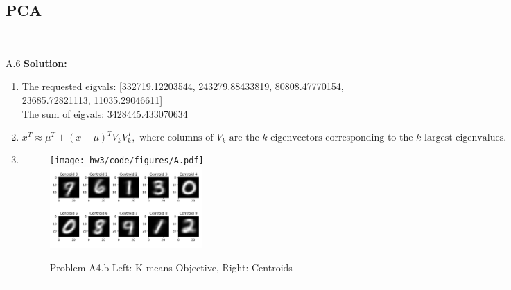 \documentclass{article}
\newcommand{\1}{\mathbf{1}}
\begin{document}
\subsection*{PCA}
\noindent\rule{\textwidth}{1pt}
\\
A.6 {\bf Solution:}\\
\begin{enumerate}
    \item The requested eigvals: [332719.12203544, 243279.88433819, 80808.47770154,  23685.72821113,  11035.29046611] \\
The sum of eigvals: 3428445.433070634
    \item $$
    x^T \approx \mu^T + (x-\mu)^TV_kV_k^T, \text{  where columns of $V_k$ are the $k$  eigenvectors corresponding to the $k$ largest eigenvalues.}
    $$
    \item \begin{figure}[h!]
            \centering
            \texttt{[image: hw3/code/figures/A.pdf]}
            \includegraphics[width=0.55\textwidth]{hw3/code/figures/A4b_centroids.pdf}
            \caption{Problem A4.b Left: K-means Objective, Right: Centroids}
        \end{figure}
\end{enumerate}   
\noindent\rule{\textwidth}{1pt}
\end{document}
